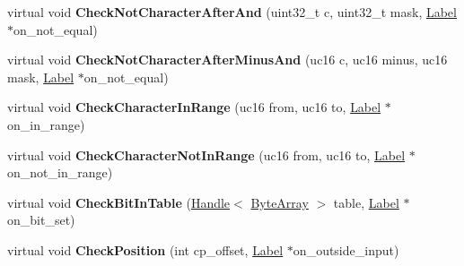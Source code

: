\begin{DoxyCompactItemize}
\item 
virtual void {\bfseries Check\+Not\+Character\+After\+And} (uint32\+\_\+t c, uint32\+\_\+t mask, \hyperlink{classv8_1_1internal_1_1_label}{Label} $\ast$on\+\_\+not\+\_\+equal)\hypertarget{classv8_1_1internal_1_1_reg_exp_macro_assembler_m_i_p_s_a672b956cbe01255fa2996705b9bedb53}{}\label{classv8_1_1internal_1_1_reg_exp_macro_assembler_m_i_p_s_a672b956cbe01255fa2996705b9bedb53}

\item 
virtual void {\bfseries Check\+Not\+Character\+After\+Minus\+And} (uc16 c, uc16 minus, uc16 mask, \hyperlink{classv8_1_1internal_1_1_label}{Label} $\ast$on\+\_\+not\+\_\+equal)\hypertarget{classv8_1_1internal_1_1_reg_exp_macro_assembler_m_i_p_s_a09f76a20823593559fb72f4ce3e556d9}{}\label{classv8_1_1internal_1_1_reg_exp_macro_assembler_m_i_p_s_a09f76a20823593559fb72f4ce3e556d9}

\item 
virtual void {\bfseries Check\+Character\+In\+Range} (uc16 from, uc16 to, \hyperlink{classv8_1_1internal_1_1_label}{Label} $\ast$on\+\_\+in\+\_\+range)\hypertarget{classv8_1_1internal_1_1_reg_exp_macro_assembler_m_i_p_s_a233eb5196a3ef4cfc2c67770f5ebba4f}{}\label{classv8_1_1internal_1_1_reg_exp_macro_assembler_m_i_p_s_a233eb5196a3ef4cfc2c67770f5ebba4f}

\item 
virtual void {\bfseries Check\+Character\+Not\+In\+Range} (uc16 from, uc16 to, \hyperlink{classv8_1_1internal_1_1_label}{Label} $\ast$on\+\_\+not\+\_\+in\+\_\+range)\hypertarget{classv8_1_1internal_1_1_reg_exp_macro_assembler_m_i_p_s_a520e3c053e1715797a8d4602b34b1d4d}{}\label{classv8_1_1internal_1_1_reg_exp_macro_assembler_m_i_p_s_a520e3c053e1715797a8d4602b34b1d4d}

\item 
virtual void {\bfseries Check\+Bit\+In\+Table} (\hyperlink{classv8_1_1internal_1_1_handle}{Handle}$<$ \hyperlink{classv8_1_1internal_1_1_byte_array}{Byte\+Array} $>$ table, \hyperlink{classv8_1_1internal_1_1_label}{Label} $\ast$on\+\_\+bit\+\_\+set)\hypertarget{classv8_1_1internal_1_1_reg_exp_macro_assembler_m_i_p_s_a4429f096364b74b5f1c27576aa7fa4ae}{}\label{classv8_1_1internal_1_1_reg_exp_macro_assembler_m_i_p_s_a4429f096364b74b5f1c27576aa7fa4ae}

\item 
virtual void {\bfseries Check\+Position} (int cp\+\_\+offset, \hyperlink{classv8_1_1internal_1_1_label}{Label} $\ast$on\+\_\+outside\+\_\+input)\hypertarget{classv8_1_1internal_1_1_reg_exp_macro_assembler_m_i_p_s_aaee2840750d16e80d7c2c254b107748f}{}\label{classv8_1_1internal_1_1_reg_exp_macro_assembler_m_i_p_s_aaee2840750d16e80d7c2c254b107748f}


\end{DoxyCompactItemize}
